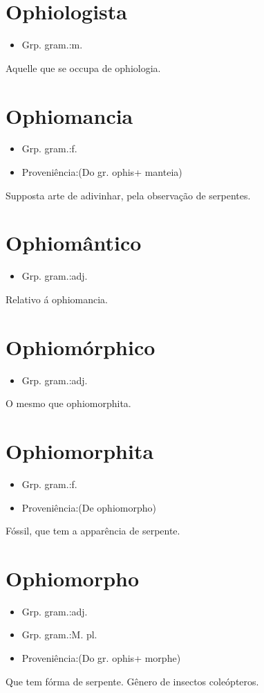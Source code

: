 \section{Ophiologista}
\begin{itemize}
\item {Grp. gram.:m.}
\end{itemize}
Aquelle que se occupa de ophiologia.
\section{Ophiomancia}
\begin{itemize}
\item {Grp. gram.:f.}
\end{itemize}
\begin{itemize}
\item {Proveniência:(Do gr. \textunderscore ophis\textunderscore  + \textunderscore manteia\textunderscore )}
\end{itemize}
Supposta arte de adivinhar, pela observação de serpentes.
\section{Ophiomântico}
\begin{itemize}
\item {Grp. gram.:adj.}
\end{itemize}
Relativo á ophiomancia.
\section{Ophiomórphico}
\begin{itemize}
\item {Grp. gram.:adj.}
\end{itemize}
O mesmo que \textunderscore ophiomorphita\textunderscore .
\section{Ophiomorphita}
\begin{itemize}
\item {Grp. gram.:f.}
\end{itemize}
\begin{itemize}
\item {Proveniência:(De \textunderscore ophiomorpho\textunderscore )}
\end{itemize}
Fóssil, que tem a apparência de serpente.
\section{Ophiomorpho}
\begin{itemize}
\item {Grp. gram.:adj.}
\end{itemize}
\begin{itemize}
\item {Grp. gram.:M. pl.}
\end{itemize}
\begin{itemize}
\item {Proveniência:(Do gr. \textunderscore ophis\textunderscore  + \textunderscore morphe\textunderscore )}
\end{itemize}
Que tem fórma de serpente.
Gênero de insectos coleópteros.
